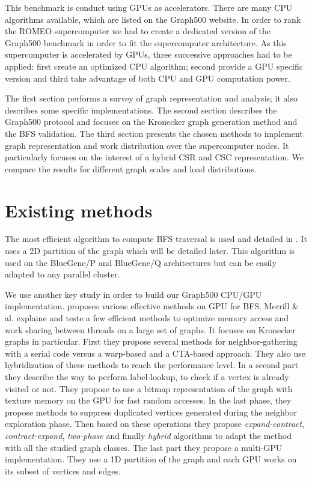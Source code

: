 This benchmark is conduct using GPUs as accelerators.
There are many CPU algorithms available, which are listed on the Graph500 website. 
In order to rank the ROMEO supercomputer we had to create a dedicated version of the Graph500 benchmark in order to fit the supercomputer architecture. 
As this supercomputer is accelerated by GPUs, three successive approaches had to be applied:  first create an optimized CPU algorithm; second provide a GPU specific version and third take advantage of both CPU and GPU computation power. 

The first section performs a survey of graph representation and analysis; it also describes some specific implementations.
The second section  describes the Graph500 protocol and focuses on the Kronecker graph generation method and the BFS validation.
The third section presents the chosen methods to implement graph representation and work distribution over the supercomputer nodes. It particularly focuses on the interest of a hybrid CSR and CSC representation.
We compare the results for different graph scales and load distributions.

\section{Existing methods}
The most efficient algorithm to compute BFS traversal is used and detailed in \cite{6468459}. 
It uses a 2D partition of the graph which will be detailed later. 
This algorithm is used on the BlueGene/P and BlueGene/Q architectures but can be easily adapted to any parallel cluster.

We use another key study in order to build our Graph500 CPU/GPU implementation. 
\cite{merrill2015high} proposes various effective methods on GPU for BFS. 
Merrill \& al. explaine and teste a few efficient methods to optimize memory access and work sharing between threads on a large set of graphs. 
It focuses on Kronecker graphs in particular. 
First they propose several methods for neighbor-gathering with a serial code versus a warp-based and a CTA-based approach. 
They also use hybridization of these methods to reach the performance level. 
In a second part they describe the way to perform label-lookup, to check if a vertex is already visited or not. 
They propose to use a bitmap representation of the graph with texture memory on the GPU for fast random accesses. 
In the last phase, they propose methods to suppress duplicated vertices generated during the neighbor exploration phase. 
Then based on these operations they propose \textit{expand-contract}, \textit{contract-expand}, \textit{two-phase} and finally \textit{hybrid} algorithms to adapt the method with all the studied graph classes.
The last part they propose a multi-GPU implementation.
They use a 1D partition of the graph and each GPU works on its subset of vertices and edges. 


